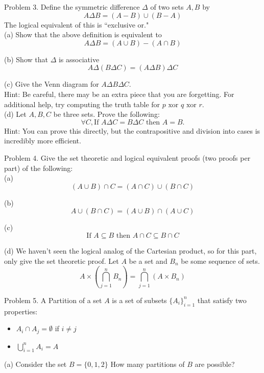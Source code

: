 \documentclass[16 pt]{amsart}
\theoremstyle{definition}
\theoremstyle{remark}
\numberwithin{equation}{subsection}
\begin{document}
\newpage

Problem 3. Define the symmetric difference $\Delta$ of two sets $A,B$ by
\[
A\Delta B = (A-B)\cup(B-A) 
\]
The logical equivalent of this is ``exclusive or."\\


(a) Show that the above definition is equivalent to
\[
A\Delta B = (A\cup B)-(A\cap B)
\]

(b) Show that $\Delta$ is associative
\[
A\Delta (B\Delta C) = (A\Delta B)\Delta C
\]

(c) Give the Venn diagram for $A\Delta B\Delta C$.\\
Hint: Be careful, there may be an extra piece that you are forgetting.  For additional help, try computing the truth table for 
$p \text{ xor } q \text{ xor } r.$\\

(d) Let $A,B,C$ be three sets.   Prove the following:
\[
\forall C, \text{If } A\Delta C = B\Delta C \text{ then } A=B.
\]
Hint: You can prove this directly, but the contrapositive and division into cases is incredibly more efficient.

\newpage

Problem 4.  Give the set theoretic and logical equivalent proofs (two proofs per part) of the following:\\

(a)
\[
(A\cup B)\cap C = (A\cap C)\cup(B\cap C)
\]

(b)
\[
A\cup(B\cap C) = (A\cup B)\cap(A\cup C)
\]

(c) 
\[
\text{If } A\subseteq B \text{ then } A\cap C \subseteq B\cap C
\]

(d) We haven't seen the logical analog of the Cartesian product, so for this part, only give the set theoretic proof.  Let $A$ be a set and $B_n$ be some sequence of sets.
\[
A\times (\bigcap_{j=1}^n B_n) = \bigcap_{j=1}^n (A\times B_n)
\]

\newpage 

Problem 5. A Partition of a set $A$ is a set of subsets $\{A_i\}_{i=1}^n$ that satisfy two properties:

\begin{itemize}
\item $A_i \cap A_j = \emptyset$ if $i\ne j$\\
\item $\bigcup_{i=1}^n A_i = A$
\end{itemize}

(a) Consider the set $B=\{0,1,2\}$  How many partitions of $B$ are possible?\\
\end{document}
